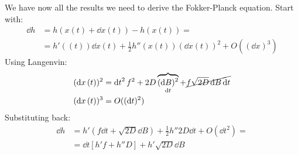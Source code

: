 \documentclass[../template.tex]{subfiles}
\begin{document}
We have now all the results we need to derive the Fokker-Planck equation. Start with:
\begin{align*}
    \dd{h} &= h(x(t) + \dd{x}(t)) - h(x(t)) =    \\   
    &= h'((t)) \dd{x}(t) + \frac{1}{2} h''(x(t))(\dd{x}(t))^2 + O((\dd{x})^3) 
\end{align*}
Using Langenvin:
\begin{align*}
    (\dd{x}(t))^2 &= \dd{t}^2 f^2 + 2D \overbrace{(\dd{B})^2}_{\dd{t}} +\cancel{ f\sqrt{2D} \dd{B} \dd{t}}\\
    (\dd{x}(t))^3 &= O((\dd{t})^2)
\end{align*}
Substituting back:
\begin{align*}
    \dd{h} &= h'(f \dd{t} + \sqrt{2D}\dd{B}) + \frac{1}{2} h'' 2 D \dd{t} + O(\dd{t}^2) = \\
    &= \dd{t} [h' f + h'' D] + h' \sqrt{2D} \dd{B}
\end{align*}
\end{document}
